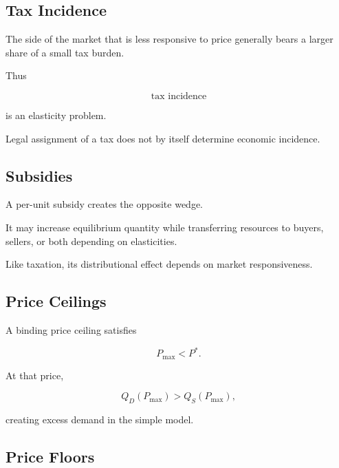 \subsection{Tax Incidence}
\label{subsec:tax-incidence}

The side of the market that is less responsive to price generally bears a
larger share of a small tax burden.

Thus

\[
\boxed{
\text{tax incidence}
}
\]

is an elasticity problem.

Legal assignment of a tax does not by itself determine economic incidence.

\subsection{Subsidies}
\label{subsec:economic-subsidies}

A per-unit subsidy creates the opposite wedge.

It may increase equilibrium quantity while transferring resources to buyers,
sellers, or both depending on elasticities.

Like taxation, its distributional effect depends on market responsiveness.

\subsection{Price Ceilings}
\label{subsec:price-ceilings}

A binding price ceiling satisfies

\[
\boxed{
P_{\max}<P^*.
}
\]

At that price,

\[
Q_D(P_{\max})
>
Q_S(P_{\max}),
\]

creating excess demand in the simple model.

\subsection{Price Floors}
\label{subsec:price-floors}

